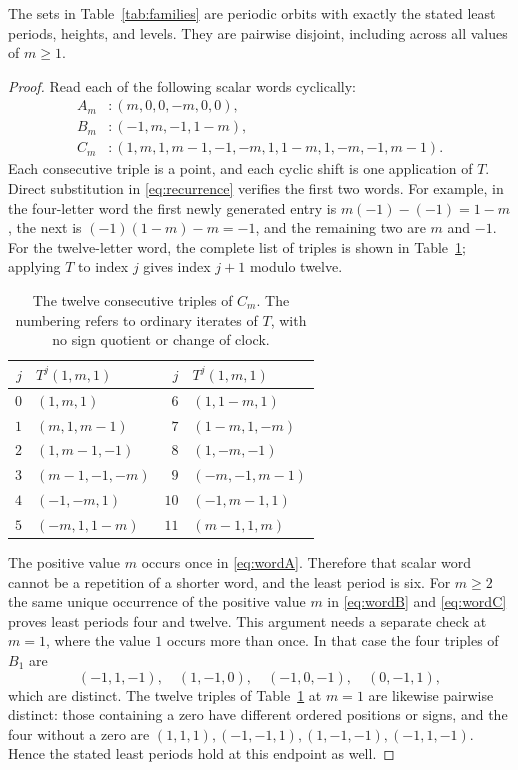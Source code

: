 \begin{proposition}\label{prop:itineraries}
The sets in Table~\ref{tab:families} are periodic orbits with exactly
the stated least periods, heights, and levels. They are pairwise
disjoint, including across all values of $m\geq1$.
\end{proposition}
\begin{proof}
Read each of the following scalar words cyclically:
\begin{align}
 A_m &: (m,0,0,-m,0,0),\label{eq:wordA}\\
 B_m &: (-1,m,-1,1-m),\label{eq:wordB}\\
 C_m &: (1,m,1,m-1,-1,-m,1,1-m,1,-m,-1,m-1).
 \label{eq:wordC}
\end{align}
Each consecutive triple is a point, and each cyclic shift is one
application of $T$. Direct substitution in
\eqref{eq:recurrence} verifies the first two words. For example, in
the four-letter word the first newly generated entry is
$m(-1)-(-1)=1-m$, the next is $(-1)(1-m)-m=-1$, and the
remaining two are $m$ and $-1$. For the twelve-letter word, the
complete list of triples is shown in Table~\ref{tab:twelve}; applying
$T$ to index $j$ gives index $j+1$ modulo twelve.

\begin{table}[htbp]
\centering
\begin{tabular}{@{}rl@{\qquad}rl@{}}
\toprule
$j$ & $T^j(1,m,1)$ & $j$ & $T^j(1,m,1)$\\
\midrule
$0$ & $(1,m,1)$ & $6$ & $(1,1-m,1)$\\
$1$ & $(m,1,m-1)$ & $7$ & $(1-m,1,-m)$\\
$2$ & $(1,m-1,-1)$ & $8$ & $(1,-m,-1)$\\
$3$ & $(m-1,-1,-m)$ & $9$ & $(-m,-1,m-1)$\\
$4$ & $(-1,-m,1)$ & $10$ & $(-1,m-1,1)$\\
$5$ & $(-m,1,1-m)$ & $11$ & $(m-1,1,m)$\\
\bottomrule
\end{tabular}
\caption{The twelve consecutive triples of $C_m$. The numbering refers
to ordinary iterates of $T$, with no sign quotient or change of clock.}
\label{tab:twelve}
\end{table}

The positive value $m$ occurs once in \eqref{eq:wordA}. Therefore
that scalar word cannot be a repetition of a shorter word, and the
least period is six. For $m\geq2$ the same unique occurrence of the
positive value $m$ in \eqref{eq:wordB} and \eqref{eq:wordC}
proves least periods four and twelve. This argument needs a separate
check at $m=1$, where the value $1$ occurs more than once. In that
case the four triples of $B_1$ are
\begin{equation}\label{eq:B1}
 (-1,1,-1),\quad(1,-1,0),\quad(-1,0,-1),\quad(0,-1,1),
\end{equation}
which are distinct. The twelve triples of Table~\ref{tab:twelve}
at $m=1$ are likewise pairwise distinct: those containing a zero
have different ordered positions or signs, and the four without a
zero are
$(1,1,1),(-1,-1,1),(1,-1,-1),(-1,1,-1)$.
Hence the stated least periods hold at this endpoint as well.


\end{proof}
